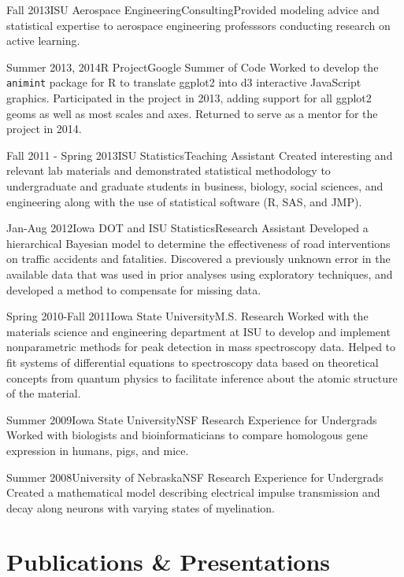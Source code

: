 \documentclass[10pt]{tccv}
\begin{document}
\begin{eventlist}
\item{Fall 2013}{ISU Aerospace Engineering}{Consulting}{Provided modeling advice and statistical expertise to aerospace engineering professsors conducting research on active learning.}

\item{Summer 2013, 2014}{R Project}{Google Summer of Code}{
Worked to develop the \texttt{animint} package for R to translate ggplot2 into d3 interactive JavaScript graphics. Participated in the project in 2013, adding support for all ggplot2 geoms as well as most scales and axes. Returned to serve as a mentor for the project in 2014. \cite{gprug2014}}

\item{Fall 2011 - Spring 2013}{ISU Statistics}{Teaching Assistant}{
Created interesting and relevant lab materials and demonstrated statistical methodology to undergraduate and graduate students in business, biology, social sciences, and engineering along with the use of statistical software (R, SAS, and JMP).}

\item{Jan-Aug 2012}{Iowa DOT and ISU Statistics}{Research Assistant}{
Developed a hierarchical Bayesian model to determine the effectiveness of road interventions on traffic accidents and fatalities. Discovered a previously unknown error in the available data that was used in prior analyses using exploratory techniques, and developed a method to compensate for missing data. }

\item{Spring 2010-Fall 2011}{Iowa State University}{M.S. Research}{
Worked with the materials science and engineering department at ISU to develop and implement nonparametric methods for peak detection in mass spectroscopy data. Helped to fit systems of differential equations to spectroscopy data based on theoretical concepts from quantum physics to facilitate inference about the atomic structure of the material. }

\item{Summer 2009}{Iowa State University}{NSF Research Experience for Undergrads}{
Worked with biologists and bioinformaticians to compare homologous gene expression in humans, pigs, and mice.\cite{towfic2010detection}}  

\item{Summer 2008}{University of Nebraska}{NSF Research Experience for Undergrads}{
Created a mathematical model describing electrical impulse transmission and decay along neurons with varying states of myelination.}
\end{eventlist}

\vspace{4.5in}
\section{Publications \& Presentations}


\nocite{*}
\end{document}
